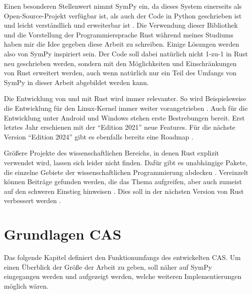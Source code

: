 \documentclass[11pt,a4paper, ngerman]{article}
\begin{document}
Einen besonderen Stellenwert nimmt SymPy ein, da dieses System einerseits als Open-Source-Projekt verfügbar ist, als auch der Code in Python geschrieben ist und leicht verständlich und erweiterbar ist \cite[S. 1]{SympyPeerJ}. Die Verwendung dieser Bibliothek und die Vorstellung der Programmiersprache Rust während meines Studiums haben mir die Idee gegeben diese Arbeit zu schreiben. Einige Lösungen werden also von SymPy inspiriert sein. Der Code soll dabei natürlich nicht 1-zu-1 in Rust neu geschrieben werden, sondern mit den Möglichkeiten und Einschränkungen von Rust erweitert werden, auch wenn natürlich nur ein Teil des Umfangs von SymPy in dieser Arbeit abgebildet werden kann.

Die Entwicklung von und mit Rust wird immer relevanter. So wird Beispielsweise die Entwicklung für den Linux-Kernel immer weiter vorangetrieben \cite{RustLinux}. Auch für die Entwicklung unter Android \cite{GoogleExample} und Windows \cite{WindowsRust} stehen erste Bestrebungen bereit. Erst letztes Jahr erschienen mit der ``Edition 2021'' \cite{RustEditon2021} neue Features. Für die nächste Version ``Edition 2024'' gibt es ebenfalls bereits eine Roadmap \cite{RustEditon2024}.

Größere Projekte des wissenschaftlichen Bereichs, in denen Rust explizit verwendet wird, lassen sich leider nicht finden. Dafür gibt es unabhängige Pakete, die einzelne Gebiete der wissenschaftlichen Programmierung abdecken \cite{RustEx1} \cite{RustEx2} \cite{RustEx3}. Vereinzelt können Beiträge gefunden werden, die das Thema aufgreifen, aber auch zumeist auf den schweren Einstieg hinweisen \cite{RustUse1} \cite{RustUse2} \cite{RustUse3}. Dies soll in der nächsten Version von Rust verbessert werden \cite{RustEditon2024Specific}.

\newpage

\section{Grundlagen CAS}
Das folgende Kapitel definiert den Funktionumfangs des entwickelten CAS. Um einen Überblick der Größe der Arbeit zu geben, soll näher auf SymPy eingegangen werden und aufgezeigt werden, welche weiteren Implementierungen möglich wären.
\end{document}
